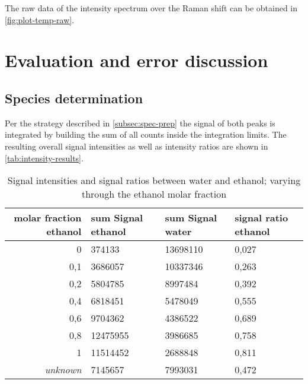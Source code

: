 The raw data of the intensity spectrum over the Raman shift can be obtained in \autoref{fig:plot-temp-raw}. 

%     

\section{Evaluation and error discussion}
\label{sec:eval}

\subsection{Species determination}
\label{subsec:spec-eval}

Per the strategy described in \autoref{subsec:spec-prep} the signal of both peaks is integrated by building the sum of all counts inside the integration limits. The resulting overall signal intensities as well as intensity ratios are shown in \autoref{tab:intensity-results}.

\begin{table}[!htb]
    \centering
    \small
    \caption[Signal intensities and signal ratios between water and ethanol]{Signal intensities and signal ratios between water and ethanol; varying through the ethanol molar fraction}
    \label{tab:intensity-results}
    \vspace{12pt}
    \begin{tabular}{|r|l|l|l|}
        \hline
        \rowcolor{lightgray} molar fraction ethanol & sum Signal ethanol & sum Signal water & signal ratio ethanol \\ \hline \hline
        0	    & 374133	& 13698110  & 0,027 \\ \hline
        0,1	    & 3686057	& 10337346  & 0,263 \\ \hline
        0,2	    & 5804785	& 8997484	& 0,392 \\ \hline
        0,4	    & 6818451	& 5478049	& 0,555 \\ \hline
        0,6	    & 9704362	& 4386522	& 0,689 \\ \hline
        0,8	    & 12475955	& 3986685	& 0,758 \\ \hline
        1	    & 11514452	& 2688848	& 0,811 \\ \hline
        \itshape{unknown}	& 7145657	& 7993031	& 0,472 \\ \hline
    \end{tabular}
\end{table}

